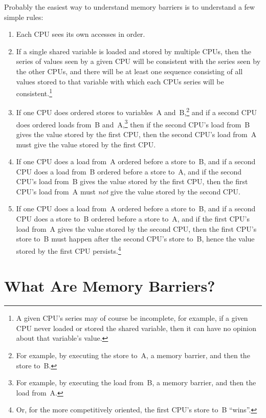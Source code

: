 Probably the easiest way to understand memory barriers is to understand
a few simple rules:

\begin{enumerate}
\item	Each CPU sees its own accesses in order.
\item	If a single shared variable is loaded and stored by multiple
	CPUs, then the series of values seen by a given CPU will be
	consistent with the series seen by the other CPUs, and there
	will be at least one sequence consisting of all values stored
	to that variable with which each CPUs series will be
	consistent.\footnote{
		A given CPU's series may of course be incomplete,
		for example, if a given CPU never loaded or stored
		the shared variable, then it can have no opinion about
		that variable's value.}
\item	If one CPU does ordered stores to variables~A and~B,\footnote{
		For example, by executing the store to~A, a
		memory barrier, and then the store to~B.}
	and if a second CPU does ordered loads from~B and~A,\footnote{
		For example, by executing the load from~B, a
		memory barrier, and then the load from~A.}
	then if the second CPU's load from~B gives the value stored
	by the first CPU, then the second CPU's load from~A must
	give the value stored by the first CPU.
\item	If one CPU does a load from~A ordered before a store to~B,
	and if a second CPU does a load from~B ordered before a store to~A,
	and if the second CPU's load from~B gives the value stored by
	the first CPU, then the first CPU's load from~A must \emph{not}
	give the value stored by the second CPU.
\item	If one CPU does a load from~A ordered before a store to~B,
	and if a second CPU does a store to~B ordered before a
	store to~A, and if the first CPU's load from~A gives
	the value stored by the second CPU, then the first CPU's
	store to~B must happen after the second CPU's store to~B,
	hence the value stored by the first CPU persists.\footnote{
		Or, for the more competitively oriented, the first
		CPU's store to~B ``wins''.}
\end{enumerate}

\section{What Are Memory Barriers?}
\label{sec:memorder:What Are Memory Barriers?}



